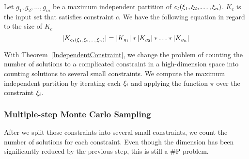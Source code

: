 \begin{theorem}
      \label{IndependentConstraint}
      Let $g_{1}, g_{2}, \ldots, g_{m}$ be a maximum independent partition of
      $c_t({\xi}_{1},{\xi}_{2},\ldots,{\xi}_{n})$.
      $K_c$ is the input set that satisfies constraint $c$. We have the following
      equation in regard to the size of $K_c$
      $$|K_{c_t({\xi}_{1},{\xi}_{2},\ldots,{\xi}_{n})}| = |K_{g_{1}}|*|K_{g_{2}}|*\ldots*|K_{g_{n}}|$$
\end{theorem}
\vspace{-3pt}
With Theorem~\ref{IndependentConstraint}, we change the problem of
counting the number of solutions to a complicated constraint in a high-dimension
space into counting solutions to several small constraints. We compute the
maximum independent partition by iterating each ${\xi}_{i}$ and applying the function
$\pi$ over the constraint ${\xi}_{i}$.



\subsubsection{Multiple-step Monte Carlo Sampling}

After we split those constraints into several small constraints, we count the
number of solutions for each constraint. Even though the dimension has been
significantly reduced by the previous step, this is still a \#P problem. 

